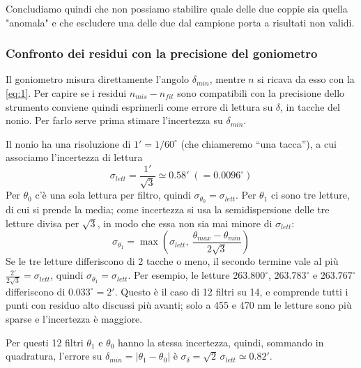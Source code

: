 \documentclass[10pt,twocolumn]{article}
\begin{document}
\noindent Concludiamo quindi che non possiamo stabilire quale delle due coppie sia quella "anomala" e che escludere una delle due dal campione porta a risultati non validi.

    \subsubsection{Confronto dei residui con la precisione del goniometro}
    Il goniometro misura direttamente l'angolo $\delta_{min}$, mentre $n$ si ricava da esso con la \eqref{eq:1}. Per capire se i residui $n_{mis}-n_{fit}$ sono compatibili con la precisione dello strumento conviene quindi esprimerli come errore di lettura su $\delta$, in tacche del nonio. Per farlo serve prima stimare l'incertezza su $\delta_{min}$.

    Il nonio ha una risoluzione di $1'=1/60^\circ$ (che chiameremo ``una tacca''), a cui associamo l'incertezza di lettura
    \[
      \sigma_{lett}=\frac{1'}{\sqrt3}\simeq0.58'\;(=0.0096^\circ)
    \]
    Per $\theta_0$ c'è una sola lettura per filtro, quindi $\sigma_{\theta_0}=\sigma_{lett}$. Per $\theta_1$ ci sono tre letture, di cui si prende la media; come incertezza si usa la semidispersione delle tre letture divisa per $\sqrt3$, in modo che essa non sia mai minore di $\sigma_{lett}$:
    \begin{equation}
      \sigma_{\theta_1}=\max\!\left(\sigma_{lett},\ \frac{\theta_{max}-\theta_{min}}{2\sqrt3}\right)
      \label{eq:sigtheta}
    \end{equation}
    Se le tre letture differiscono di 2 tacche o meno, il secondo termine vale al più $\frac{2'}{2\sqrt3}=\sigma_{lett}$, quindi $\sigma_{\theta_1}=\sigma_{lett}$. Per esempio, le letture $263.800^\circ$, $263.783^\circ$ e $263.767^\circ$ differiscono di $0.033^\circ=2'$. Questo è il caso di 12 filtri su 14, e comprende tutti i punti con residuo alto discussi più avanti; solo a 455 e 470 nm le letture sono più sparse e l'incertezza è maggiore.

    \noindent Per questi 12 filtri $\theta_1$ e $\theta_0$ hanno la stessa incertezza, quindi, sommando in quadratura, l'errore su $\delta_{min}=|\theta_1-\theta_0|$ è $\sigma_\delta=\sqrt2\,\sigma_{lett}\simeq0.82'$.
\end{document}
